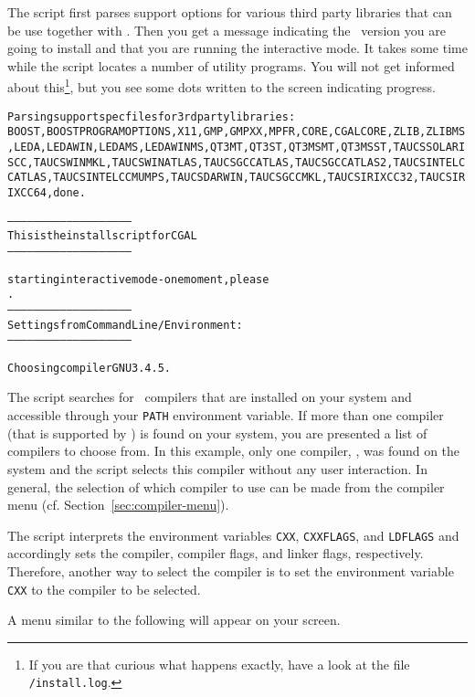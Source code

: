 The script first parses support options for various third party
libraries that can be use together with \cgal. Then you get a message
indicating the \cgal\ version you are going to install and that you
are running the interactive mode. It takes some time while the script
locates a number of utility programs. You will not get informed about
this\footnote{If you are that curious what happens exactly, have a
  look at the file
  \texttt{\cgaldir/install.log}.}, but you see
some dots written to the screen indicating progress.

{\ccTexHtml{\scriptsize}{}
\begin{alltt}
Parsing support specfiles for 3rd party libraries:
BOOST, BOOSTPROGRAMOPTIONS, X11, GMP, GMPXX, MPFR, CORE, CGALCORE, ZLIB, ZLIBMS, LEDA, LEDAWIN, LEDAMS, LEDAWINMS, QT3MT, QT3ST, QT3MSMT, QT3MSST, TAUCSSOLARISCC, TAUCSWINMKL, TAUCSWINATLAS, TAUCSGCCATLAS, TAUCSGCCATLAS2, TAUCSINTELCCATLAS, TAUCSINTELCCMUMPS, TAUCSDARWIN, TAUCSGCCMKL, TAUCSIRIXCC32, TAUCSIRIXCC64, done.

--------------------------------------------------------
  This is the install script for CGAL \cgalrelease
--------------------------------------------------------

starting interactive mode - one moment, please
.
--------------------------------------------------------
Settings from Command Line/Environment:
--------------------------------------------------------

  Choosing compiler GNU 3.4.5.
\end{alltt}}

The script searches for \CC\ compilers that are installed on your
system and accessible through your \texttt{PATH} environment variable.
If more than one compiler (that is supported by \cgal) is found on
your system, you are presented a list of compilers to choose from. In
this example, only one compiler, , was found on the system
and the script selects this compiler without any user interaction. In
general, the selection of which compiler to use can be made from the
compiler menu (cf. Section~\ref{sec:compiler-menu}).

The script interprets the environment variables \texttt{CXX},
\texttt{CXXFLAGS}, and \texttt{LDFLAGS} and accordingly sets the
compiler, compiler flags, and linker flags, respectively.  Therefore,
another way to select the compiler is to set the environment variable
\texttt{CXX} to the compiler to be selected.

A menu similar to the following will appear on your screen.

